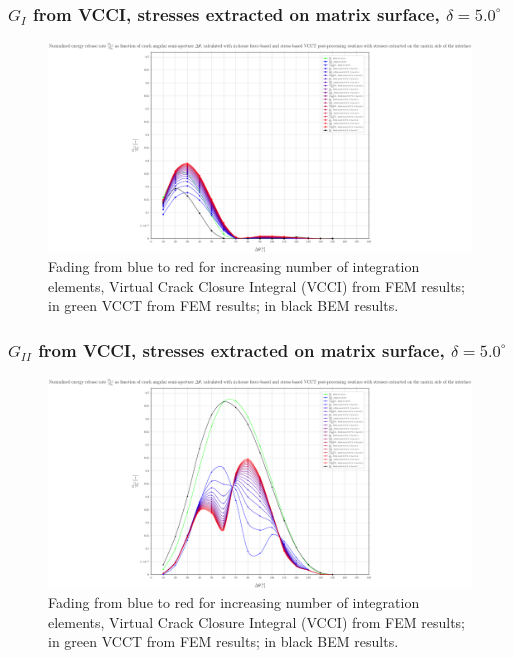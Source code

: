 \begin{frame}
\frametitle{\small $G_{I}$ from VCCI, stresses extracted on matrix surface, $\delta=5.0^{\circ}$}
\vspace{-0.75cm}
\centering
\captionsetup[figure]{font=scriptsize,labelfont=scriptsize}
\begin{figure}[!h]
\centering
\includegraphics[height=0.7\textheight]{2017-07-25_AbqRunSummary_SmallStrain_D05/pdf/2017-07-25_AbqRunSummary_SmallStrain_D05_F-SoM-VCCT_GI.pdf}
  \caption{\scriptsize Fading from blue to red for increasing number of integration elements, Virtual Crack Closure Integral (VCCI) from FEM results; in green VCCT from FEM results; in black BEM results.}
  \label{fig:res1}
\end{figure}
\end{frame}
\begin{frame}
\frametitle{\small $G_{II}$ from VCCI, stresses extracted on matrix surface, $\delta=5.0^{\circ}$}
\vspace{-0.75cm}
\centering
\captionsetup[figure]{font=scriptsize,labelfont=scriptsize}
\begin{figure}[!h]
\centering
\includegraphics[height=0.7\textheight]{2017-07-25_AbqRunSummary_SmallStrain_D05/pdf/2017-07-25_AbqRunSummary_SmallStrain_D05_F-SoM-VCCT_GII.pdf}
  \caption{\scriptsize Fading from blue to red for increasing number of integration elements, Virtual Crack Closure Integral (VCCI) from FEM results; in green VCCT from FEM results; in black BEM results.}
  \label{fig:res1}
\end{figure}
\end{frame}

